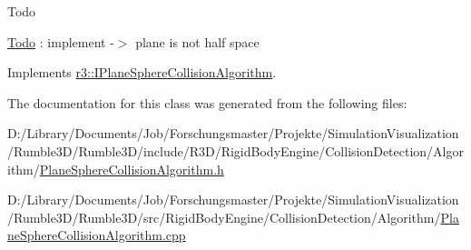 \begin{DoxyRefDesc}{Todo}
\item[\mbox{\hyperlink{todo__todo000009}{Todo}}]\+: implement -\/$>$ plane is not half space \end{DoxyRefDesc}


Implements \mbox{\hyperlink{classr3_1_1_i_plane_sphere_collision_algorithm_a92ddfd3ba00ed53b183a6aef41b04a60}{r3\+::\+I\+Plane\+Sphere\+Collision\+Algorithm}}.



The documentation for this class was generated from the following files\+:\begin{DoxyCompactItemize}
\item 
D\+:/\+Library/\+Documents/\+Job/\+Forschungsmaster/\+Projekte/\+Simulation\+Visualization/\+Rumble3\+D/\+Rumble3\+D/include/\+R3\+D/\+Rigid\+Body\+Engine/\+Collision\+Detection/\+Algorithm/\mbox{\hyperlink{_plane_sphere_collision_algorithm_8h}{Plane\+Sphere\+Collision\+Algorithm.\+h}}\item 
D\+:/\+Library/\+Documents/\+Job/\+Forschungsmaster/\+Projekte/\+Simulation\+Visualization/\+Rumble3\+D/\+Rumble3\+D/src/\+Rigid\+Body\+Engine/\+Collision\+Detection/\+Algorithm/\mbox{\hyperlink{_plane_sphere_collision_algorithm_8cpp}{Plane\+Sphere\+Collision\+Algorithm.\+cpp}}\end{DoxyCompactItemize}
